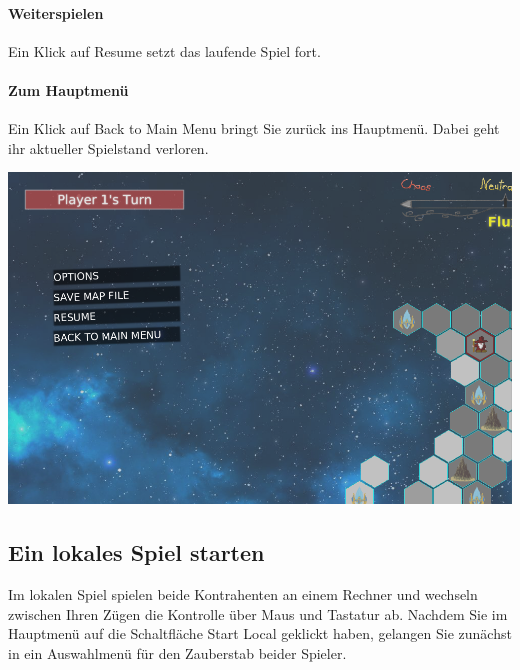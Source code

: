 \documentclass[a4paper,12pt]{scrartcl}
\begin{document}
	\paragraph{Weiterspielen}
	Ein Klick auf \glqq Resume\grqq\hspace{0.05em}  setzt das laufende Spiel fort.
	
	\paragraph{Zum Hauptmenü}
	Ein Klick auf \glqq Back to Main Menu\grqq\hspace{0.05em}  bringt Sie zurück ins Hauptmenü. Dabei geht ihr aktueller Spielstand verloren.
	
	\begin{center}\includegraphics[width=\textwidth]{Prog2_EA_V2/screenshots/Pausemenu.png}\end{center}
	
	\subsection{Ein lokales Spiel starten}
	Im lokalen Spiel spielen beide Kontrahenten an einem Rechner und wechseln zwischen Ihren Zügen die Kontrolle über Maus und Tastatur ab.
	Nachdem Sie im Hauptmenü auf die Schaltfläche \glqq Start Local\grqq\hspace{0.05em}  geklickt haben, gelangen Sie zunächst in ein Auswahlmenü für den Zauberstab beider Spieler.
	
\end{document}
